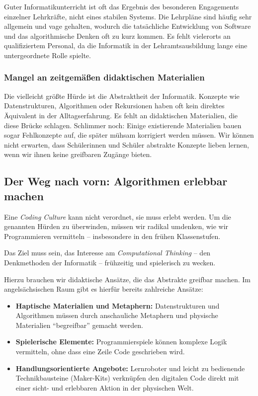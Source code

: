 \documentclass[a5paper,pagesize,10pt,bibtotoc,pointlessnumbers,
normalheadings,DIV=9,twoside=false]{scrbook}
\begin{document}
Guter Informatikunterricht ist oft das Ergebnis des besonderen Engagements einzelner Lehrkräfte, nicht eines stabilen Systems. Die Lehrpläne sind häufig sehr allgemein und vage gehalten, wodurch die tatsächliche Entwicklung von Software und das algorithmische Denken oft zu kurz kommen. Es fehlt vielerorts an qualifiziertem Personal, da die Informatik in der Lehramtsausbildung lange eine untergeordnete Rolle spielte.

\subsubsection{Mangel an zeitgemäßen didaktischen Materialien}

Die vielleicht größte Hürde ist die Abstraktheit der Informatik. Konzepte wie Datenstrukturen, Algorithmen oder Rekursionen haben oft kein direktes Äquivalent in der Alltagserfahrung. Es fehlt an didaktischen Materialien, die diese Brücke schlagen. Schlimmer noch: Einige existierende Materialien bauen sogar Fehlkonzepte auf, die später mühsam korrigiert werden müssen. Wir können nicht erwarten, dass Schülerinnen und Schüler abstrakte Konzepte lieben lernen, wenn wir ihnen keine greifbaren Zugänge bieten.

\subsection*{Der Weg nach vorn: Algorithmen erlebbar machen}

Eine \textit{Coding Culture} kann nicht verordnet, sie muss erlebt werden. Um die genannten Hürden zu überwinden, müssen wir radikal umdenken, wie wir Programmieren vermitteln -- insbesondere in den frühen Klassenstufen.

Das Ziel muss sein, das Interesse am \textit{Computational Thinking} -- den Denkmethoden der Informatik -- frühzeitig und spielerisch zu wecken.

Hierzu brauchen wir didaktische Ansätze, die das Abstrakte greifbar machen. Im angelsächsischen Raum gibt es hierfür bereits zahlreiche Ansätze:

\begin{itemize}
    \item \textbf{Haptische Materialien und Metaphern:} Datenstrukturen und Algorithmen müssen durch anschauliche Metaphern und physische Materialien ``begreifbar'' gemacht werden.
    \item \textbf{Spielerische Elemente:} Programmierspiele können komplexe Logik vermitteln, ohne dass eine Zeile Code geschrieben wird.
    \item \textbf{Handlungsorientierte Angebote:} Lernroboter und leicht zu bedienende Technikbausteine (Maker-Kits) verknüpfen den digitalen Code direkt mit einer sicht- und erlebbaren Aktion in der physischen Welt.
\end{itemize}
\end{document}
